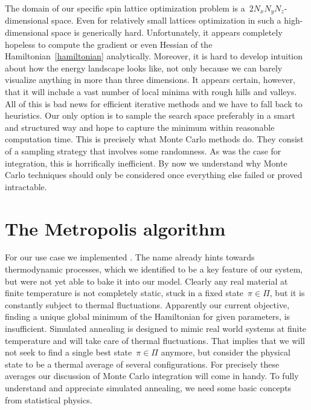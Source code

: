 The domain of our specific spin lattice optimization problem is a~$2 N_x N_y
N_z$-dimensional space. Even for relatively small lattices optimization in such
a high-dimensional space is generically hard. Unfortunately, it appears
completely hopeless to compute the gradient or even Hessian of the
Hamiltonian~\eqref{hamiltonian} analytically. Moreover, it is hard to develop
intuition about how the energy landscape looks like, not only because we can
barely visualize anything in more than three dimensions. It appears certain,
however, that it will include a vast number of local minima with rough hills and
valleys. All of this is bad news for efficient iterative methods and we have to
fall back to heuristics. Our only option is to sample the search space
preferably in a smart and structured way and hope to capture the minimum within
reasonable computation time. This is precisely what Monte Carlo methods do. They
consist of a sampling strategy that involves some randomness. As was the case
for integration, this is horrifically inefficient. By now we understand why
Monte Carlo techniques should only be considered once everything else failed or
proved intractable.
%
\section{The Metropolis algorithm}\label{sec:metropolis}
%
For our use case we implemented . The name already
hints towards thermodynamic processes, which we identified to be a key
feature of our system, but were not yet able to bake it into our model. Clearly
any real material at finite temperature is not completely static, \ie{} stuck in
a fixed state~$\pi \in \Pi$, but it is constantly subject to thermal
fluctuations. Apparently our current objective, finding a unique global minimum
of the Hamiltonian for given parameters, is insufficient. Simulated annealing is
designed to mimic real world systems at finite temperature and will take care of
thermal fluctuations. That implies that we will not seek to find a single best
state~$\pi \in \Pi$ anymore, but consider the physical state to be a thermal
average of several configurations. For precisely these averages our discussion
of Monte Carlo integration will come in handy. To fully understand and
appreciate simulated annealing, we need some basic concepts from statistical
physics.


